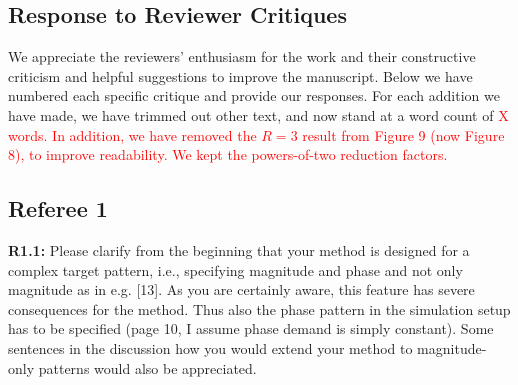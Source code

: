 \documentclass[11pt]{article}
\newcommand{\mysubsectionstar}[1]{\vspace{0mm}\subsection*{#1}\vspace{0mm}}
\begin{document}


\onecolumn

\setlength{\parskip}{0pt}

\clearpage
\newpage
\pagestyle{empty}		%

\footskip 15pt

\mysubsectionstar{Response to Reviewer Critiques}
We appreciate the reviewers' enthusiasm for the work and their constructive criticism and helpful suggestions to improve the manuscript.
Below we have numbered each specific critique and provide our responses.
For each addition we have made, we have trimmed out other text, and now stand at a word count of \textcolor{red}{X words.} 
\textcolor{red}{In addition, we have removed the $R = 3$ result from Figure 9 (now Figure 8), to improve readability. 
We kept the powers-of-two reduction factors.}

\mysubsectionstar{Referee 1}
{\bf R1.1:} Please clarify from the beginning that your method is designed for a complex target pattern, i.e., specifying magnitude and phase and not only magnitude as in e.g. [13]. As you are certainly aware, this feature has severe consequences for the method. Thus also the phase pattern in the simulation setup has to be specified (page 10, I assume phase demand is simply constant). Some sentences in the discussion how you would extend your method to magnitude-only patterns would also be appreciated.
\\[0.2em] 
\\[1.2em]
\end{document}
